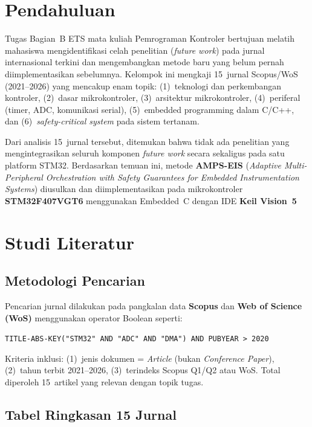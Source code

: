 \documentclass[12pt,a4paper]{article}
\begin{document}
\section{Pendahuluan}

Tugas Bagian~B ETS mata kuliah Pemrograman Kontroler bertujuan
melatih mahasiswa mengidentifikasi celah penelitian (\textit{future work})
pada jurnal internasional terkini dan mengembangkan metode baru yang
belum pernah diimplementasikan sebelumnya. Kelompok ini mengkaji
15~jurnal Scopus/WoS (2021--2026) yang mencakup enam topik:
(1)~teknologi dan perkembangan kontroler,
(2)~dasar mikrokontroler,
(3)~arsitektur mikrokontroler,
(4)~periferal (timer, ADC, komunikasi serial),
(5)~embedded programming dalam C/C++, dan
(6)~\textit{safety-critical system} pada sistem tertanam.

Dari analisis 15~jurnal tersebut, ditemukan bahwa tidak ada penelitian
yang mengintegrasikan seluruh komponen \textit{future work} secara
sekaligus pada satu platform STM32. Berdasarkan temuan ini, metode
\textbf{AMPS-EIS} (\textit{Adaptive Multi-Peripheral Orchestration
with Safety Guarantees for Embedded Instrumentation Systems}) diusulkan
dan diimplementasikan pada mikrokontroler \textbf{STM32F407VGT6}
menggunakan Embedded~C dengan IDE \textbf{Keil \textmu{}Vision~5}

\section{Studi Literatur}
\label{sec:litrev}

\subsection{Metodologi Pencarian}

Pencarian jurnal dilakukan pada pangkalan data \textbf{Scopus} dan
\textbf{Web of Science (WoS)} menggunakan operator Boolean seperti:
\begin{center}
\texttt{TITLE-ABS-KEY("STM32" AND "ADC" AND "DMA") AND PUBYEAR > 2020}
\end{center}
Kriteria inklusi: (1)~jenis dokumen = \textit{Article} (bukan
\textit{Conference Paper}), (2)~tahun terbit 2021--2026,
(3)~terindeks Scopus Q1/Q2 atau WoS. Total diperoleh 15~artikel yang
relevan dengan topik tugas.

\subsection{Tabel Ringkasan 15 Jurnal}
\end{document}
